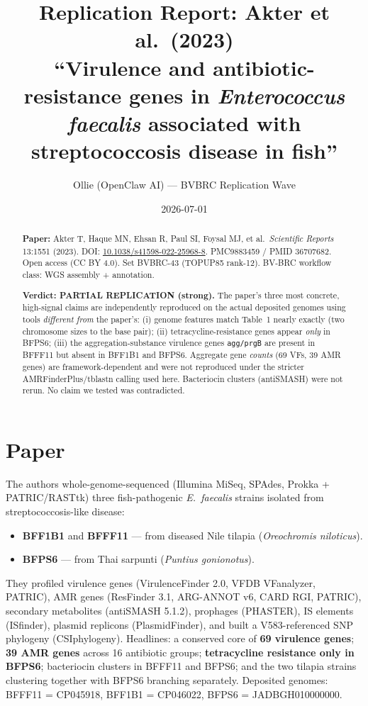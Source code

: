 \documentclass[11pt]{article}
\title{Replication Report: Akter et al.\ (2023)\\
\large ``Virulence and antibiotic-resistance genes in \emph{Enterococcus faecalis} associated with streptococcosis disease in fish''}
\author{Ollie (OpenClaw AI) --- BVBRC Replication Wave}
\date{2026-07-01}
\begin{document}
\maketitle

\begin{abstract}
\noindent\textbf{Paper:} Akter T, Haque MN, Ehsan R, Paul SI, Foysal MJ, et al.\ \emph{Scientific Reports} 13:1551 (2023). DOI: \href{https://doi.org/10.1038/s41598-022-25968-8}{10.1038/s41598-022-25968-8}. PMC9883459 / PMID 36707682. Open access (CC BY 4.0). Set BVBRC-43 (TOPUP85 rank-12). BV-BRC workflow class: WGS assembly + annotation.

\noindent\textbf{Verdict: PARTIAL REPLICATION (strong).} The paper's three most concrete, high-signal claims are independently reproduced on the actual deposited genomes using tools \emph{different from} the paper's: (i) genome features match Table~1 nearly exactly (two chromosome sizes to the base pair); (ii) tetracycline-resistance genes appear \emph{only} in BFPS6; (iii) the aggregation-substance virulence genes \texttt{agg/prgB} are present in BFFF11 but absent in BFF1B1 and BFPS6. Aggregate gene \emph{counts} (69 VFs, 39 AMR genes) are framework-dependent and were not reproduced under the stricter AMRFinderPlus/tblastn calling used here. Bacteriocin clusters (antiSMASH) were not rerun. No claim we tested was contradicted.
\end{abstract}

\section{Paper}
The authors whole-genome-sequenced (Illumina MiSeq, SPAdes, Prokka + PATRIC/RASTtk) three fish-pathogenic \emph{E.\ faecalis} strains isolated from streptococcosis-like disease:
\begin{itemize}
\item \textbf{BFF1B1} and \textbf{BFFF11} --- from diseased Nile tilapia (\emph{Oreochromis niloticus}).
\item \textbf{BFPS6} --- from Thai sarpunti (\emph{Puntius gonionotus}).
\end{itemize}
They profiled virulence genes (VirulenceFinder 2.0, VFDB VFanalyzer, PATRIC), AMR genes (ResFinder 3.1, ARG-ANNOT v6, CARD RGI, PATRIC), secondary metabolites (antiSMASH 5.1.2), prophages (PHASTER), IS elements (ISfinder), plasmid replicons (PlasmidFinder), and built a V583-referenced SNP phylogeny (CSIphylogeny). Headlines: a conserved core of \textbf{69 virulence genes}; \textbf{39 AMR genes} across 16 antibiotic groups; \textbf{tetracycline resistance only in BFPS6}; bacteriocin clusters in BFFF11 and BFPS6; and the two tilapia strains clustering together with BFPS6 branching separately. Deposited genomes: BFFF11 = CP045918, BFF1B1 = CP046022, BFPS6 = JADBGH010000000.
\end{document}
